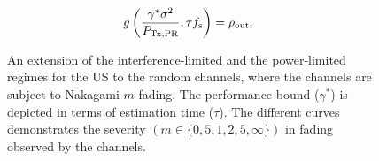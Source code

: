\begin{align*}
g\left(\frac{\gamma^* \sigma^2}{P_{\text{Tx,PR}}}, \tau f_{\text{s}}\right) &= \rho_{\text{out}}. \nonumber  
\end{align*}
\begin{figure}[!t]
\vspace{\figmara}

\centering
{}
\vspace{\figmard}
\caption{An extension of the interference-limited and the power-limited regimes for the US to the random channels, where the channels are subject to Nakagami-$m$ fading. The performance bound ($\gamma^*$) is depicted in terms of estimation time ($\tau$). The different curves demonstrates the severity $(m \in \{0,5,1,2,5, \infty \})$ in fading observed by the channels.}
\label{fig:or_fad}
\vspace{\figmarb}
\end{figure}
